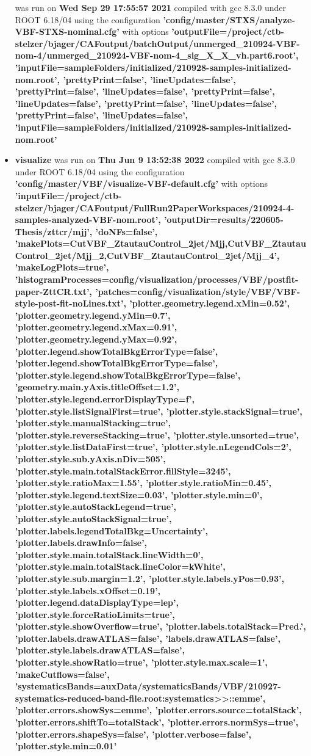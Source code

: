 \documentclass{article}
\begin{document}
\begin{itemize}
was run on \textbf{Wed Sep 29 17:55:57 2021} compiled with gcc 8.3.0 under ROOT 6.18/04 using the configuration \textbf{'config/master/STXS/analyze-VBF-STXS-nominal.cfg'} with options \textbf{'outputFile=/project/ctb-stelzer/bjager/CAFoutput/batchOutput/unmerged\_210924-VBF-nom-4/unmerged\_210924-VBF-nom-4\_sig\_X\_X\_vh.part6.root', 'inputFile=sampleFolders/initialized/210928-samples-initialized-nom.root', 'prettyPrint=false', 'lineUpdates=false', 'prettyPrint=false', 'lineUpdates=false', 'prettyPrint=false', 'lineUpdates=false', 'prettyPrint=false', 'lineUpdates=false', 'prettyPrint=false', 'lineUpdates=false', 'inputFile=sampleFolders/initialized/210928-samples-initialized-nom.root'} \item \textbf{visualize} was run on \textbf{Thu Jun  9 13:52:38 2022} compiled with gcc 8.3.0 under ROOT 6.18/04 using the configuration \textbf{'config/master/VBF/visualize-VBF-default.cfg'} with options \textbf{'inputFile=/project/ctb-stelzer/bjager/CAFoutput/FullRun2PaperWorkspaces/210924-4-samples-analyzed-VBF-nom.root', 'outputDir=results/220605-Thesis/zttcr/mjj', 'doNFs=false', 'makePlots=CutVBF\_ZtautauControl\_2jet/Mjj,CutVBF\_ZtautauControl\_2jet/Mjj\_2,CutVBF\_ZtautauControl\_2jet/Mjj\_4', 'makeLogPlots=true', 'histogramProcesses=config/visualization/processes/VBF/postfit-paper-ZttCR.txt', 'patches=config/visualization/style/VBF/VBF-style-post-fit-noLines.txt', 'plotter.geometry.legend.xMin=0.52', 'plotter.geometry.legend.yMin=0.7', 'plotter.geometry.legend.xMax=0.91', 'plotter.geometry.legend.yMax=0.92', 'plotter.legend.showTotalBkgErrorType=false', 'plotter.legend.showTotalBkgErrorType=false', 'plotter.style.legend.showTotalBkgErrorType=false', 'geometry.main.yAxis.titleOffset=1.2', 'plotter.style.legend.errorDisplayType=f', 'plotter.style.listSignalFirst=true', 'plotter.style.stackSignal=true', 'plotter.style.manualStacking=true', 'plotter.style.reverseStacking=true', 'plotter.style.unsorted=true', 'plotter.style.listDataFirst=true', 'plotter.style.nLegendCols=2', 'plotter.style.sub.yAxis.nDiv=505', 'plotter.style.main.totalStackError.fillStyle=3245', 'plotter.style.ratioMax=1.55', 'plotter.style.ratioMin=0.45', 'plotter.style.legend.textSize=0.03', 'plotter.style.min=0', 'plotter.style.autoStackLegend=true', 'plotter.style.autoStackSignal=true', 'plotter.labels.legendTotalBkg=Uncertainty', 'plotter.labels.drawInfo=false', 'plotter.style.main.totalStack.lineWidth=0', 'plotter.style.main.totalStack.lineColor=kWhite', 'plotter.style.sub.margin=1.2', 'plotter.style.labels.yPos=0.93', 'plotter.style.labels.xOffset=0.19', 'plotter.legend.dataDisplayType=lep', 'plotter.style.forceRatioLimits=true', 'plotter.style.showOverflow=true', 'plotter.labels.totalStack=Pred.', 'plotter.labels.drawATLAS=false', 'labels.drawATLAS=false', 'plotter.style.labels.drawATLAS=false', 'plotter.style.showRatio=true', 'plotter.style.max.scale=1', 'makeCutflows=false', 'systematicsBands=auxData/systematicsBands/VBF/210927-systematics-reduced-band-file.root:systematics>>::emme', 'plotter.errors.showSys=emme', 'plotter.errors.source=totalStack', 'plotter.errors.shiftTo=totalStack', 'plotter.errors.normSys=true', 'plotter.errors.shapeSys=false', 'plotter.verbose=false', 'plotter.style.min=0.01'} \end{itemize}
\end{document}
